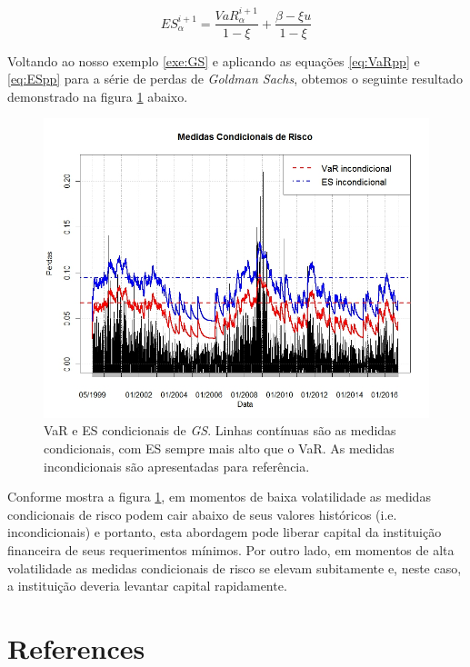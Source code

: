 \documentclass[review]{elsarticle}
\theoremstyle{definition}
\begin{document}
\begin{equation}
\label{eq:ESpp}
ES_\alpha^{i+1} = \frac{VaR_\alpha^{i+1}}{1-\xi}+\frac{\beta-\xi u}{1-\xi}
\end{equation}

Voltando ao nosso exemplo \ref{exe:GS} e aplicando as equações \eqref{eq:VaRpp} e \eqref{eq:ESpp} para a série de perdas de \emph{Goldman Sachs}, obtemos o seguinte resultado demonstrado na figura \ref{fig:figevtGS2} abaixo.

\begin{figure}[h]
	\centering
	\includegraphics[width=0.9\linewidth]{figs/figevtGS2}
	\caption[VaR e ES condicionais através de um processo pontual de auto-excitação]{VaR e ES condicionais de \emph{GS}. Linhas contínuas são as medidas condicionais, com ES sempre mais alto que o VaR. As medidas incondicionais são apresentadas para referência.}
	\label{fig:figevtGS2}
\end{figure}

Conforme mostra a figura \ref{fig:figevtGS2}, em momentos de baixa volatilidade as medidas condicionais de risco podem cair abaixo de seus valores históricos (i.e. incondicionais) e portanto, esta abordagem pode liberar capital da instituição financeira de seus requerimentos mínimos. Por outro lado, em momentos de alta volatilidade as medidas condicionais de risco se elevam subitamente e, neste caso, a instituição deveria levantar capital rapidamente.

\section*{References}


\end{document}
